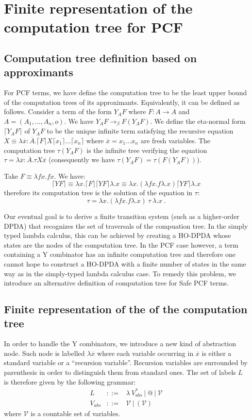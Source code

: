 \documentclass{article}
\newcommand{\aux}[1]{\lceil #1\rceil}
\newcommand{\betared}{\rightarrow_\beta}
\newcommand{\syneq}{\equiv}
\begin{document}
\section{Finite representation of the computation tree for PCF}

\subsection{Computation tree definition based on approximants}
For PCF terms, we have define the computation tree to be the least upper bound of the computation trees of its approximants. Equivalently, it can be defined as follows. Consider a term of the form $Y_A F$ where $F:A\rightarrow A$ and $A = (A_1,\ldots,A_n,o)$.
We have $Y_A F \betared F (Y_A F)$.
We define the eta-normal form $\aux{Y_A F}$ of $Y_A F$ to be the unique infinite term satisfying the recursive equation $X \syneq \lambda \overline{x}: \overline{A} . \aux{F} X \aux{x_1} \ldots \aux{x_n} $
where $\overline{x} = x_1 \ldots x_n$ are fresh variables.
The computation tree $\tau(Y_A F)$ is the infinite tree verifying the equation 
$\tau =  \lambda \overline{x}: \overline{A} . \tau X \overline{x}$ (consequently we have $\tau(Y_A F) = \tau(F (Y_A F))$).

Take $F \syneq \lambda f x. f x$. We have:
$$\aux{Y F} \syneq \lambda x . \aux{F} \aux{Y F} \lambda.x \syneq \lambda x. (\lambda f x. f \lambda.x ) \aux{Y F} \lambda.x$$ therefore its computation tree is the solution of the equation in $\tau$: $$\tau = \lambda x . (\lambda f x. f \lambda.x) \ \tau \ \lambda.x \ .$$


Our eventual goal is to derive a finite transition system (such as a higher-order DPDA) that recognizes the set of traversals of the compuation tree. In the simply typed lambda calculus, this can be achieved by creating a HO-DPDA whose states are the nodes of the computation tree.
In the PCF case however, a term containing a Y combinator has an infinite computation tree and therefore one cannot hope to
 construct a HO-DPDA with a finite number of states in the same way as in the
simply-typed lambda calculus case.
To remedy this problem, we introduce an alternative definition of computation tree for Safe PCF terms.

\subsection{Finite representation of the of the computation tree}

In order to handle the Y combinators, we introduce a new kind of abstraction node. Such node is labelled $\lambda \overline{x}$ where each variable occurring in $\overline{x}$ is either a standard variable or a ``recursion variable''.
Recursion variables are surrounded by parenthesis in order to distinguish them from standard ones. The set of labels $L$ is therefore given by the following grammar:
\begin{eqnarray*}
L &::=& \lambda\ V_{abs}^*\ |\ @\ |\ \mathcal{V} \\
V_{abs} &::=& \mathcal{V}\ |\ (\mathcal{V})
\end{eqnarray*}
where $\mathcal{V}$ is a countable set of variables.
\end{document}
